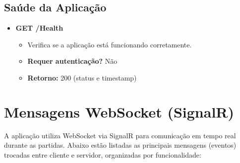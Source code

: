 \subsection{Saúde da Aplicação}
\begin{itemize}
    \item \textbf{GET /Health}
    \begin{itemize}
        \item Verifica se a aplicação está funcionando corretamente.
        \item \textbf{Requer autenticação?} Não
        \item \textbf{Retorno:} 200 (status e timestamp)
    \end{itemize}
\end{itemize}

\section{Mensagens WebSocket (SignalR)}

A aplicação utiliza WebSocket via SignalR para comunicação em tempo real durante as partidas. Abaixo estão listadas as principais mensagens (eventos) trocadas entre cliente e servidor, organizadas por funcionalidade:

